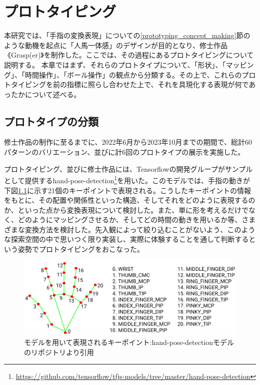 \chapter{プロトタイピング}
\label{prototyping}
本研究では、「手指の変換表現」についての\ref{prototyping_concept_making}節のような動機を起点に「人馬一体感」のデザインが目的となり、修士作品《Grasp(er)》を制作した。ここでは、その過程にあるプロトタイピングについて説明する。
本章ではまず、それらのプロトタイプについて、「形状」、「マッピング」、「時間操作」、「ボール操作」の観点から分類する。その上で、これらのプロトタイピングを前の指標に照らし合わせた上で、それを具現化する表現が何であったかについて述べる。

\section{プロトタイプの分類}
修士作品の制作に至るまでに、2022年6月から2023年10月までの期間で、総計60パターンのバリエーション、並びに計6回のプロトタイプの展示を実施した。

プロトタイピング、並びに修士作品には、Tensorflowの開発グループがサンプルとして提供するhand-pose-detection\footnote{\url{https://github.com/tensorflow/tfjs-models/tree/master/hand-pose-detection}}を用いた。このモデルでは、手指の動きが下図\ref{fig:keypoints}に示す21個のキーポイントで表現される。こうしたキーポイントの情報をもとに、その配置や関係性といった構造、そしてそれをどのように表現するのか、といった点から変換表現について検討した。また、単に形を考えるだけでなく、どのようにマッピングさせるか、そしてどの時間の動きを用いるか等、さまざまな変換方法を検討した。先入観によって絞り込むことがないよう、このような探索空間の中で思いつく限り実装し、実際に体験することを通して判断するという姿勢でプロトタイピングをおこなった。

\begin{figure}[H]
  \centering
  \includegraphics[width=15cm]{img/hand_keypoints.png}
  \caption{モデルを用いて表現されるキーポイント:hand-pose-detectionモデルのリポジトリより引用}
  \label{fig:keypoints}
\end{figure}

